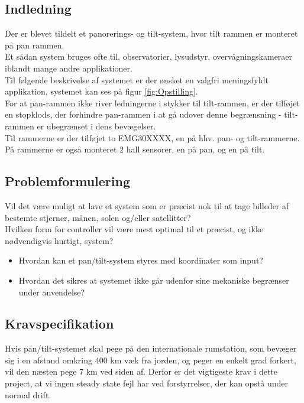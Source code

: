 \subsection{Indledning}
Der er blevet tildelt et panorerings- og tilt-system, hvor tilt rammen er monteret på pan rammen.\\
Et sådan system bruges ofte til, observatorier, lysudstyr, overvågningskameraer iblandt mange andre applikationer.\\
Til følgende beskrivelse af systemet er der ønsket en valgfri meningsfyldt applikation, systemet kan ses på figur \ref{fig:Opstilling}.\\
For at pan-rammen ikke river ledningerne i stykker til tilt-rammen, er der tilføjet en stopklods, der forhindre pan-rammen i at gå udover denne begrænsning - tilt-rammen er ubegrænset i dens bevægelser.\\
Til rammerne er der tilføjet to EMG30\cite{emg30Data}XXXX, en på hhv. pan- og tilt-rammerne.\\
På rammerne er også monteret 2 hall sensorer, en på pan, og en på tilt. 


\subsection{Problemformulering}

Vil det være muligt at lave et system som er præcist nok til at tage billeder af bestemte stjerner, månen, solen og/eller satellitter?\\
Hvilken form for controller vil være mest optimal til et præcist, og ikke nødvendigvis hurtigt, system?

\begin{itemize}
	\item Hvordan kan et pan/tilt-system styres med koordinater som input?
	\item Hvordan det sikres at systemet ikke går udenfor sine mekaniske begrænser under anvendelse?
\end{itemize}

\subsection{Kravspecifikation}

Hvis pan/tilt-systemet skal pege på den internationale rumstation, som bevæger sig i en afstand omkring 400 km væk fra jorden, og peger en enkelt grad forkert, vil den næsten pege 7 km ved siden af. Derfor er det vigtigeste krav i dette project, at vi ingen steady state fejl har ved forstyrrelser, der kan opstå under normal drift.

